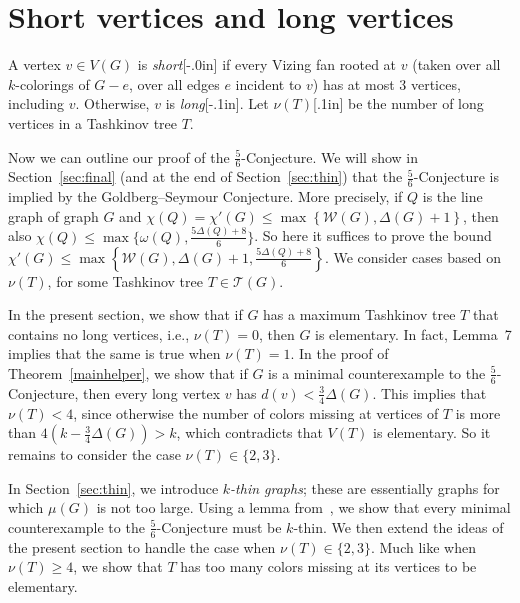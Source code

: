 \documentclass[12pt]{article}
\newcommand{\aaside}[2]{\marginnote{\scriptsize{#1}}[#2]}
\theoremstyle{plain}
\theoremstyle{definition}
\theoremstyle{remark}
\newcommand{\fancy}[1]{\mathcal{#1}}
\newcommand{\W}{\fancy{W}}
\newcommand{\T}{\fancy{T}}
\newcommand{\set}[1]{\left\{ #1 \right\}}
\newcommand{\ceil}[1]{\left\lceil#1\right\rceil}
\newcommand{\floor}[1]{\left\lfloor#1\right\rfloor}
\begin{document}
\section{Short vertices and long vertices}
\label{sec:short}
A vertex $v \in V(G)$ is \emph{short}\aaside{short vertex}{-.0in} if every
Vizing fan rooted at $v$ (taken over all $k$-colorings of $G-e$, over all edges
$e$ incident to $v$) has at most 3 vertices, including $v$.  Otherwise, $v$ is
\emph{long}\aaside{long vertex}{-.1in}.  Let $\nu(T)$\aaside{$\nu(T)$}{.1in} be the
number of long vertices in a Tashkinov tree $T$.

Now we can outline our proof of the $\frac56$-Conjecture.  We will show in
Section~\ref{sec:final} (and at the end of Section~\ref{sec:thin})
that the $\frac56$-Conjecture is implied
by the Goldberg--Seymour Conjecture.  More precisely, if $Q$ is the line graph
of graph $G$ and
$\chi(Q)=\chi'(G)\le\max\set{\W(G),\Delta(G)+1}$, then also $\chi(Q)\le
\max\{\omega(Q),\frac{5\Delta(Q)+8}6\}$.  So here it suffices to prove the bound
$\chi'(G)\le\max\set{\W(G), \Delta(G)+1, \frac{5\Delta(Q)+8}6}$.  We consider
cases based on $\nu(T)$, for some Tashkinov tree $T\in \T(G)$.

In the present section, we show that if $G$ has a maximum Tashkinov tree $T$ that contains
no long vertices, i.e., $\nu(T)=0$, then $G$ is elementary.  In fact, Lemma~7
implies that the same is true when $\nu(T)=1$.  In the proof of
Theorem~\ref{mainhelper}, we show that if $G$ is a minimal counterexample to
the $\frac56$-Conjecture, then every long vertex $v$ has
$d(v)<\frac34\Delta(G)$.  This implies that $\nu(T)< 4$, since otherwise
the number of colors missing at vertices of $T$ is more than
$4(k-\frac34\Delta(G))>k$, which contradicts that $V(T)$ is elementary.
So it remains to consider the case $\nu(T)\in\{2,3\}$.

In Section~\ref{sec:thin}, we introduce \emph{$k$-thin graphs};
these are essentially graphs for which $\mu(G)$ is not too large.  Using a lemma
from~\cite{rabern2011strengthening}, we show that every minimal counterexample
to the $\frac56$-Conjecture must be $k$-thin.  We then extend the ideas of the
present section to handle the case when $\nu(T)\in\{2,3\}$.  Much like when
$\nu(T)\ge 4$, we show that $T$ has too many colors missing at its vertices to
be elementary. 
\end{document}
